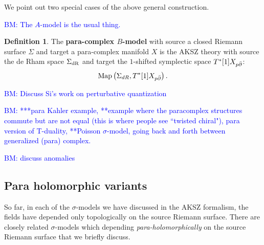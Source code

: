 \documentclass{article}
\theoremstyle{definition}
\newtheorem{Def}[theorem]{Definition}
\theoremstyle{remark}
\def\brian{\textcolor{blue}{BM: }\textcolor{blue}}
\begin{document}
We point out two special cases of the above general construction. 

\brian{The $A$-model is the usual thing.}

\begin{Def}
The {\bf para-complex $B$-model} with source a closed Riemann surface $\Sigma$ and target a para-complex manifold $X$ is the AKSZ theory with source the de Rham space $\Sigma_{\rm dR}$ and target the $1$-shifted symplectic space $T^*[1] X_{p \Bar{\partial}}$:
\[
{\rm Map}\left(\Sigma_{dR}, T^*[1]  X_{p \Bar{\partial}}\right) .
\]
\end{Def}

\brian{Discuss Si's work on perturbative quantization}

\hrulefill

\brian{***para Kahler example, **example where the paracomplex structures commute but are not equal (this is where people see ``twisted chiral"), para version of T-duality, **Poisson $\sigma$-model, going back and forth between generalized (para) complex.
}  

 \brian{discuss anomalies}

\subsection{Para holomorphic variants}

So far, in each of the $\sigma$-models we have discussed in the AKSZ formalism, the fields have depended only topologically on the source Riemann surface. 
There are closely related $\sigma$-models which depending {\em para-holomorphically} on the source Riemann surface that we briefly discuss. 
\end{document}
